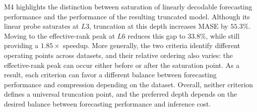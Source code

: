 M4 highlights the distinction between saturation of linearly decodable forecasting performance and the performance of the resulting truncated model. Although its linear probe saturates at \(L3\), truncation at this depth increases MASE by \(55.3\%\). Moving to the effective-rank peak at \(L6\) reduces this gap to \(33.8\%\), while still providing a \(1.85\times\) speedup. More generally, the two criteria identify different operating points across datasets, and their relative ordering also varies: the effective-rank peak can occur either before or after the saturation point. As a result, each criterion can favor a different balance between forecasting performance and compression depending on the dataset. Overall, neither criterion defines a universal truncation point, and the preferred depth depends on the desired balance between forecasting performance and inference cost.

